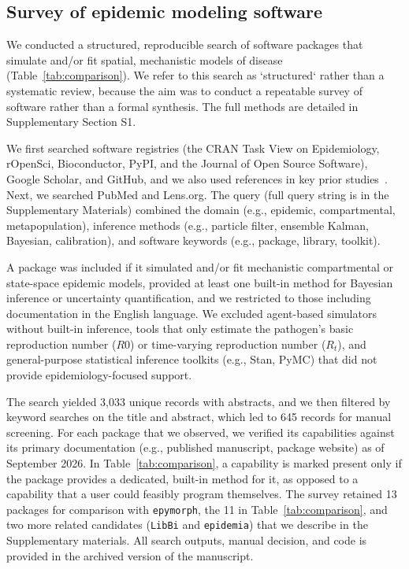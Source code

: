 \subsection{Survey of epidemic modeling software}\label{sec:methods-survey}

We conducted a structured, reproducible search of software packages that simulate and/or fit spatial, mechanistic models of disease (Table~\ref{tab:comparison}).
We refer to this search as `structured` rather than a systematic review, because the aim was to conduct a repeatable survey of software rather than a formal synthesis.
The full methods are detailed in Supplementary Section S1.

We first searched software registries (the CRAN Task View on Epidemiology, rOpenSci, Bioconductor, PyPI, and the Journal of Open Source Software), Google Scholar, and GitHub, and we also used references in key prior studies~\citep{king_statistical_2016,asfaw_tutorial_2024,lemaitre_flepimop_2024}.
Next, we searched PubMed and Lens.org.
The query (full query string is in the Supplementary Materials) combined the domain (e.g., epidemic, compartmental, metapopulation), inference methods (e.g., particle filter, ensemble Kalman, Bayesian, calibration), and software keywords (e.g., package, library, toolkit).

A package was included if it simulated and/or fit mechanistic compartmental or state-space epidemic models, provided at least one built-in method for Bayesian inference or uncertainty quantification, and we restricted to those including documentation in the English language.
We excluded agent-based simulators without built-in inference, tools that only estimate the pathogen's basic reproduction number ($R0$) or time-varying reproduction number ($R_t$), and general-purpose statistical inference toolkits (e.g., Stan, PyMC) that did not provide epidemiology-focused support.

The search yielded 3,033 unique records with abstracts, and we then filtered by keyword searches on the title and abstract, which led to 645 records for manual screening.
For each package that we observed, we verified its capabilities against its primary documentation (e.g., published manuscript, package website) as of September 2026.
In Table~\ref{tab:comparison}, a capability is marked present only if the package provides a dedicated, built-in method for it, as opposed to a capability that a user could feasibly program themselves.
The survey retained 13 packages for comparison with \texttt{epymorph}, the 11 in Table~\ref{tab:comparison}, and two more related candidates (\texttt{LibBi} and \texttt{epidemia}) that we describe in the Supplementary materials.
All search outputs, manual decision, and code is provided in the archived version of the manuscript.
